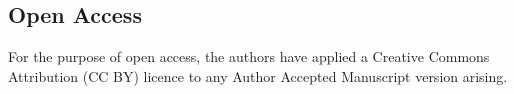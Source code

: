 \documentclass[pdflatex,sn-mathphys-num]{sn-jnl}
\begin{document}
\subsection*{Open Access}
For the purpose of open access, the authors have applied a Creative Commons Attribution (CC BY) licence to any Author Accepted Manuscript version arising.
\end{document}
